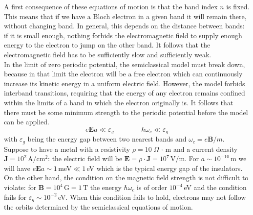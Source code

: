 \documentclass[10.75pt,a4paper,openright,bottom=2cm]{article}
\renewcommand{\Vec}[1]{\boldsymbol{#1}}
\begin{document}
A first consequence of these equations of motion is that the band index $n$ is fixed. This means that if we have a Bloch electron in a given band it will remain there, without changing band. In general, this depends on the distance between bands: if it is small enough, nothing forbids the electromagnetic field to supply enough energy to the electron to jump on the other band. It follows that the electromagnetic field has to be sufficiently slow and sufficiently weak.\\
In the limit of zero periodic potential, the semiclassical model must break down, because in that limit the electron will be a free electron which can continuously increase its kinetic energy in a uniform electric field. However, the model forbids interband transitions, requiring that the energy of any electron remains confined within the limits of a band in which the electron originally is. It follows that there must be some minimum strength to the periodic potential before the model can be applied. 
\[
e\Vec{E}a\ll \varepsilon_g \qquad\qquad \hbar\omega_c\ll \varepsilon_g 
\]
with $\varepsilon_g$ being the energy gap between two nearest bands and $\omega_c=e\Vec{B}/m$.\\
Suppose to have a metal with a resistivity $\rho=10\;\Omega\,\cdot$\,m and a current density $\Vec{J}=10^2$\,A/cm$^2$: the electric field will be $\Vec{E}=\rho\cdot\Vec{J}=10^7$\,V/m. For $a\sim10^{-10}$\,m we will have $e\Vec{E}a\sim1$\,meV$\ll1$\,eV which is the typical energy gap of the insulators. On the other hand, the condition on the magnetic field strength is not difficult to violate: for $\Vec{B}=10^4$\,G$=1$\,T the energy $\hbar\omega_c$ is of order $10^{-4}$\,eV and the condition fails for $\varepsilon_g\sim10^{-2}$\,eV. When this condition fails to hold, electrons may not follow the orbits determined by the semiclassical equations of motion.\\
\end{document}
